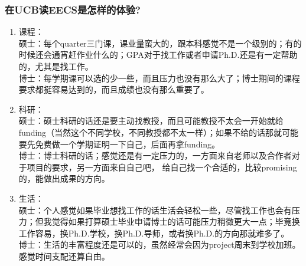 \documentclass[a4paper,UTF8]{book}
\begin{document}
    \subsubsection*{在UCB读EECS是怎样的体验?}
        \begin{enumerate}[itemindent=0pt,itemsep=0pt,parsep=0pt]
            \item 课程：\\
            硕士：每个quarter三门课，课业量蛮大的，跟本科感觉不是一个级别的；有的时候还会通宵赶作业什么的；GPA对于找工作或者申请Ph.D.还是有一定帮助的，尤其是找工作。\\
            博士：每学期课可以选的少一些，而且压力也没有那么大了；博士期间的课程要求都挺容易达到的，而且成绩也没有那么重要了。
            \item 科研：\\
                硕士：硕士科研的话还是要主动找教授，而且可能教授不太会一开始就给funding（当然这个不同学校，不同教授都不太一样）；如果不给的话那就可能要先免费做一个学期证明一下自己，后面再拿funding。\\
                博士：博士科研的话；感觉还是有一定压力的，一方面来自老师以及合作者对于项目的要求，另一方面来自自己吧， 给自己找一个合适的，比较promising的，能做出成果的方向。
            \item 生活：\\
                硕士：个人感觉如果毕业想找工作的话生活会轻松一些，尽管找工作也会有压力；但我觉得如果打算硕士毕业申请博士的话可能压力稍微更大一点；毕竟换工作容易，换Ph.D.学校，换Ph.D.导师，或者换Ph.D.的方向那就难多了。\\
                博士：生活的丰富程度还是可以的，虽然经常会因为project周末到学校加班。感觉时间支配还算自由。
        \end{enumerate}
\end{document}
